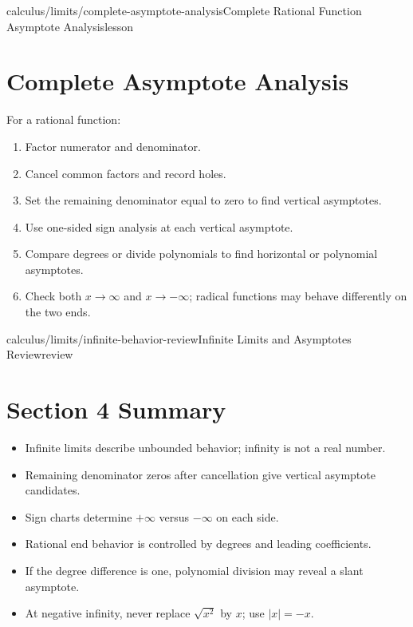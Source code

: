 \begin{webpage}{calculus/limits/complete-asymptote-analysis}{Complete Rational Function Asymptote Analysis}{lesson}
\section{Complete Asymptote Analysis}

\begin{bgmethod}[title={Rational-Function Analysis Checklist}]
For a rational function:
\begin{enumerate}
  \item Factor numerator and denominator.
  \item Cancel common factors and record holes.
  \item Set the remaining denominator equal to zero to find vertical asymptotes.
  \item Use one-sided sign analysis at each vertical asymptote.
  \item Compare degrees or divide polynomials to find horizontal or polynomial asymptotes.
  \item Check both \(x\to\infty\) and \(x\to-\infty\); radical functions may behave differently on the two ends.
\end{enumerate}
\end{bgmethod}
\end{webpage}

\begin{webpage}{calculus/limits/infinite-behavior-review}{Infinite Limits and Asymptotes Review}{review}
\section*{Section 4 Summary}

\begin{bgsummary}
\begin{itemize}
  \item Infinite limits describe unbounded behavior; infinity is not a real number.
  \item Remaining denominator zeros after cancellation give vertical asymptote candidates.
  \item Sign charts determine \(+\infty\) versus \(-\infty\) on each side.
  \item Rational end behavior is controlled by degrees and leading coefficients.
  \item If the degree difference is one, polynomial division may reveal a slant asymptote.
  \item At negative infinity, never replace \(\sqrt{x^2}\) by \(x\); use \(|x|=-x\).
\end{itemize}
\end{bgsummary}
\end{webpage}

